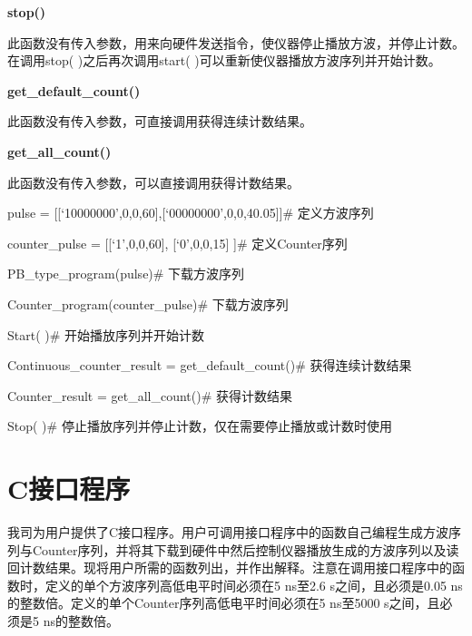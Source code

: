 \noindent\fontsize{12pt}{\baselineskip}\textbf{stop()}

此函数没有传入参数，用来向硬件发送指令，使仪器停止播放方波，并停止计数。在调用stop( )之后再次调用start( )可以重新使仪器播放方波序列并开始计数。
\vspace{0.4cm}

\noindent\fontsize{12pt}{\baselineskip}\textbf{get\_default\_count()}

此函数没有传入参数，可直接调用获得连续计数结果。
\vspace{0.4cm}

\noindent\fontsize{12pt}{\baselineskip}\textbf{get\_all\_count()}

此函数没有传入参数，可以直接调用获得计数结果。
\vspace{0.4cm}

\noindent\fontsize{12pt}{\baselineskip}\textbf{}

pulse = [[`10000000',0,0,60],[`00000000',0,0,40.05]]\qquad \#  定义方波序列

counter\_pulse = [[`1',0,0,60], [`0',0,0,15] ]\qquad           \#  定义Counter序列

PB\_type\_program(pulse)\qquad            \#  下载方波序列

Counter\_program(counter\_pulse)\qquad     \#  下载方波序列

Start( )\qquad          \#  开始播放序列并开始计数

Continuous\_counter\_result = get\_default\_count()\qquad    \#  获得连续计数结果

Counter\_result = get\_all\_count()\qquad                  \#  获得计数结果

Stop( )\qquad     \#  停止播放序列并停止计数，仅在需要停止播放或计数时使用

\section{C\heiti 接口程序}
我司为用户提供了C接口程序。用户可调用接口程序中的函数自己编程生成方波序列与Counter序列，并将其下载到硬件中然后控制仪器播放生成的方波序列以及读回计数结果。现将用户所需的函数列出，并作出解释。注意在调用接口程序中的函数时，定义的单个方波序列高低电平时间必须在5 ns至2.6 s之间，且必须是0.05 ns的整数倍。定义的单个Counter序列高低电平时间必须在5 ns至5000 s之间，且必须是5 ns的整数倍。


